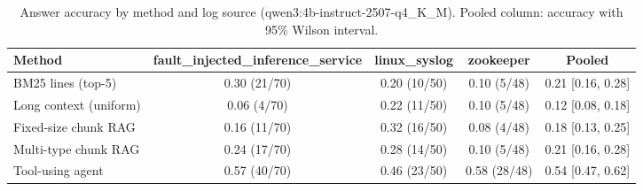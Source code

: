 \begin{table}[t]
\centering
\caption{Answer accuracy by method and log source (qwen3:4b-instruct-2507-q4_K_M). Pooled column: accuracy with 95\% Wilson interval.}
\label{tab:main_comparison__qwen3_4b_instruct}
\begin{tabular}{@{}lcccc@{}}
\toprule
Method & fault\_injected\_inference\_service & linux\_syslog & zookeeper & Pooled \\
\midrule
BM25 lines (top-5) & 0.30 (21/70) & 0.20 (10/50) & 0.10 (5/48) & 0.21 [0.16, 0.28] \\
Long context (uniform) & 0.06 (4/70) & 0.22 (11/50) & 0.10 (5/48) & 0.12 [0.08, 0.18] \\
Fixed-size chunk RAG & 0.16 (11/70) & 0.32 (16/50) & 0.08 (4/48) & 0.18 [0.13, 0.25] \\
Multi-type chunk RAG & 0.24 (17/70) & 0.28 (14/50) & 0.10 (5/48) & 0.21 [0.16, 0.28] \\
Tool-using agent & 0.57 (40/70) & 0.46 (23/50) & 0.58 (28/48) & 0.54 [0.47, 0.62] \\
\bottomrule
\end{tabular}
\end{table}
